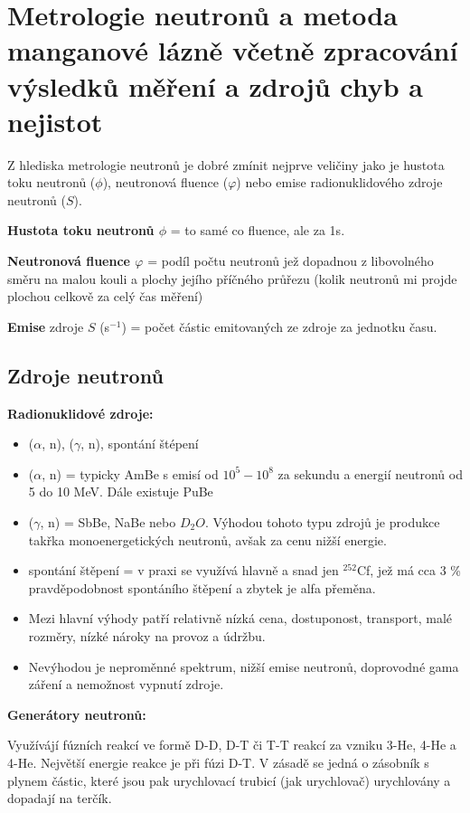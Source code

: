 \section[Metrologie neutronů \& manganová lázeň]{Metrologie neutronů a metoda manganové lázně včetně zpracování výsledků měření a zdrojů chyb a nejistot}

Z hlediska metrologie neutronů je dobré zmínit nejprve veličiny jako je hustota toku neutronů ($\phi$), neutronová fluence ($\varphi$) nebo emise radionuklidového zdroje neutronů ($S$).

\textbf{Hustota toku neutronů $\phi$} = to samé co fluence, ale za 1s.

\textbf{Neutronová fluence $\varphi$} = podíl počtu neutronů jež dopadnou z libovolného směru na malou kouli a plochy jejího příčného průřezu (kolik neutronů mi projde plochou celkově za celý čas měření)

\textbf{Emise} zdroje $S$ (s$^{-1}$) = počet částic emitovaných ze zdroje za jednotku času.

\subsection{Zdroje neutronů}

\textbf{Radionuklidové zdroje:}

\begin{itemize}
    \item ($\alpha$, n), ($\gamma$, n), spontání štépení
    \item ($\alpha$, n) = typicky AmBe s emisí od $10^5 - 10^8$ za sekundu a energií neutronů od 5 do 10 MeV. Dále existuje PuBe
    \item ($\gamma$, n) = SbBe, NaBe nebo $D_2O$. Výhodou tohoto typu zdrojů je produkce takřka monoenergetických neutronů, avšak za cenu nižší energie.
    \item spontání štěpení = v praxi se využívá hlavně a snad jen $^{252}$Cf, jež má cca 3 \% pravděpodobnost spontáního štěpení a zbytek je alfa přeměna.
    \item Mezi hlavní výhody patří relativně nízká cena, dostuponost, transport, malé rozměry, nízké nároky na provoz a údržbu.
    \item Nevýhodou je neproměnné spektrum, nižší emise neutronů, doprovodné gama záření a nemožnost vypnutí zdroje.
\end{itemize}

\textbf{Generátory neutronů:}

Využívájí fúzních reakcí ve formě D-D, D-T či T-T reakcí za vzniku 3-He, 4-He a 4-He. Největší energie reakce je při fúzi D-T. V zásadě se jedná o zásobník s plynem částic, které jsou pak urychlovací trubicí (jak urychlovač) urychlovány a dopadají na terčík.

